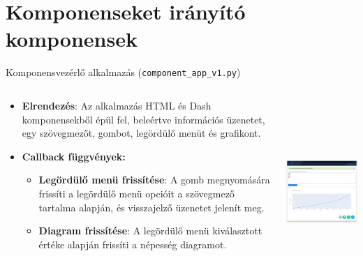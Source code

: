 \documentclass[english, aspectratio=169]{beamer}
\makeatletter
\let\origtableofcontents=\tableofcontents
\def\tableofcontents{\@ifnextchar[{\origtableofcontents}{\gobbletableofcontents}}
\def\gobbletableofcontents#1{\origtableofcontents}
\makeatother
\begin{document}
\section{Komponenseket irányító komponensek}

\begin{frame}{}
	\tableofcontents[currentsection]
\end{frame}

\begin{frame}{Komponensvezérlő alkalmazás (\texttt{component\_app\_v1.py})}
	\begin{columns}
		\begin{column}{.5\textwidth}
			\begin{itemize}
				\item \textbf{Elrendezés}: Az alkalmazás HTML és Dash komponensekből épül fel, beleértve információs üzenetet, egy szövegmezőt, gombot, legördülő menüt és grafikont.
				\item \textbf{Callback függvények:}
				\begin{itemize}
					\item \textbf{Legördülő menü frissítése}: A gomb megnyomására frissíti a legördülő menü opcióit a szövegmező tartalma alapján, és visszajelző üzenetet jelenít meg.
					\item \textbf{Diagram frissítése}: A legördülő menü kiválasztott értéke alapján frissíti a népesség diagramot.
				\end{itemize}
			\end{itemize}
		\end{column}
		\begin{column}{.5\textwidth}
			\begin{center}
				\includegraphics[width=7cm, height=7cm, keepaspectratio]{images/freq_23.png}
			\end{center}	
		\end{column}
	\end{columns}
\end{frame}
\end{document}
